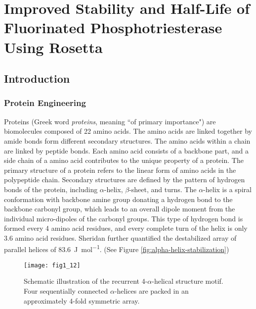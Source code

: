 \chapter{Improved Stability and Half-Life of Fluorinated Phosphotriesterase
Using Rosetta} 
\label{chap:uaa}

\begin{refsection}

\section{Introduction}

\subsection{Protein Engineering}
\label{sec:protein-engineering}

Proteins (Greek word \emph{proteins}, meaning “of
primary importance") are biomolecules composed of 22 amino
acids\cite{Nelson2005}. The amino acids are linked together by amide bonds form
different secondary structures.  The amino acids within a chain are linked by
peptide bonds. Each amino acid consists of a backbone part, and a side chain of
a amino acid contributes to the unique property of a protein. The primary
structure of a protein refers to the linear form of amino acids in the
polypeptide chain\cite{Sanger1945}. Secondary structures are defined by the
pattern of hydrogen bonds of the protein, including $\alpha$-helix,
$\beta$-sheet, and turns\cite{PAULING1951}. The $\alpha$-helix is a spiral
conformation with backbone amine group donating a hydrogen bond to the backbone
carbonyl group, which leads to an overall dipole moment from the individual
micro-dipoles of the carbonyl groups\cite{Hol1978}. This type of  hydrogen bond
is formed every 4 amino acid residues, and every complete turn of the helix is
only 3.6 amino acid residues. Sheridan  further quantified the
destabilized array of parallel helices of
\SI{83.6}{\joule\per\mol}\cite{Sheridan1982}. (See Figure
\ref{fig:alpha-helix-stabilization})
\begin{figure}[h!] \centering \texttt{[image: fig1\_12]}
    \caption[Schematic illustration of the recurrent 4-$\alpha$-helical
    structure motif. Four sequentially connected $\alpha$-helices are packed in
an approximately 4-fold symmetric array.]{Schematic illustration of the
    recurrent 4-$\alpha$-helical structure motif. Four sequentially connected
    $\alpha$-helices are packed in an approximately 4-fold symmetric
    array\cite{Sheridan1982}.} 
    

\end{figure}
\end{refsection}
